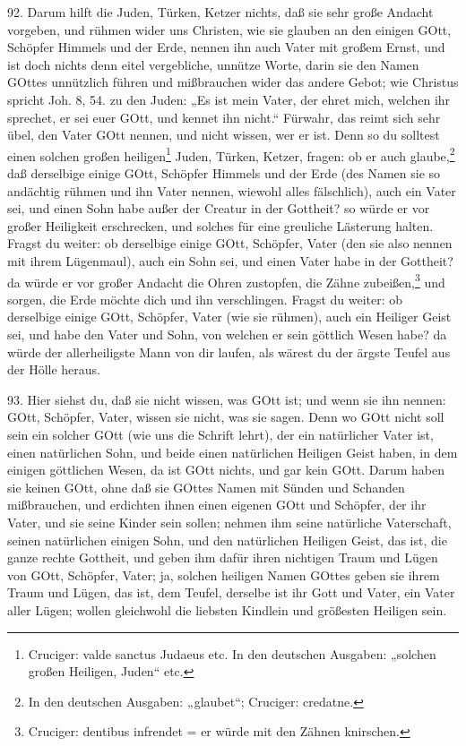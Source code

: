 92. Darum hilft die Juden, Türken, Ketzer nichts, daß sie sehr große Andacht vorgeben, und rühmen wider uns Christen, wie sie glauben an den einigen GOtt, Schöpfer Himmels und der Erde, nennen ihn auch Vater mit großem Ernst, und ist doch nichts denn eitel vergebliche, unnütze Worte, darin sie den Namen GOttes unnützlich führen und mißbrauchen wider das andere Gebot; wie Christus spricht Joh. 8, 54. zu den Juden: „Es ist mein Vater, der ehret mich, welchen ihr sprechet, er sei euer GOtt, und kennet ihn nicht.“ Fürwahr, das reimt sich sehr übel, den Vater GOtt nennen, und nicht wissen, wer er ist. Denn so du solltest einen solchen großen heiligen\footnote{Cruciger: valde sanctus Judaeus etc. In den deutschen Ausgaben: „solchen großen Heiligen, Juden“ etc.} Juden, Türken, Ketzer, fragen: ob er auch glaube,\footnote{In den deutschen Ausgaben: „glaubet“; Cruciger: credatne.} daß derselbige einige GOtt, Schöpfer Himmels und der Erde (des Namen sie so andächtig rühmen und ihn Vater nennen, wiewohl alles fälschlich), auch ein Vater sei, und einen Sohn habe außer der Creatur in der Gottheit? so würde er vor großer Heiligkeit erschrecken, und solches für eine greuliche Lästerung halten. Fragst du weiter: ob derselbige einige GOtt, Schöpfer, Vater (den sie also nennen mit ihrem Lügenmaul), auch ein Sohn sei, und einen Vater habe in der Gottheit? da würde er vor großer Andacht die Ohren zustopfen, die Zähne zubeißen,\footnote{Cruciger: dentibus infrendet = er würde mit den Zähnen knirschen.} und sorgen, die Erde möchte dich und ihn verschlingen. Fragst du weiter: ob derselbige einige GOtt, Schöpfer, Vater (wie sie rühmen), auch ein Heiliger Geist sei, und habe den Vater und Sohn, von welchen er sein göttlich Wesen habe? da würde der allerheiligste Mann von dir laufen, als wärest du der ärgste Teufel aus der Hölle heraus.

93. Hier siehst du, daß sie nicht wissen, was GOtt ist; und wenn sie ihn nennen: GOtt, Schöpfer, Vater, wissen sie nicht, was sie sagen. Denn wo GOtt nicht soll sein ein solcher GOtt (wie uns die Schrift lehrt), der ein natürlicher Vater ist, einen natürlichen Sohn, und beide einen natürlichen Heiligen Geist haben, in dem einigen göttlichen Wesen, da ist GOtt nichts, und gar kein GOtt. Darum haben sie keinen GOtt, ohne daß sie GOttes Namen mit Sünden und Schanden mißbrauchen, und erdichten ihnen einen eigenen GOtt und Schöpfer, der ihr Vater, und sie seine Kinder sein sollen; nehmen ihm seine natürliche Vaterschaft, seinen natürlichen einigen Sohn, und den natürlichen Heiligen Geist, das ist, die ganze rechte Gottheit, und geben ihm dafür ihren nichtigen Traum und Lügen von GOtt, Schöpfer, Vater; ja, solchen heiligen Namen GOttes geben sie ihrem Traum und Lügen, das ist, dem Teufel, derselbe ist ihr Gott und Vater, ein Vater aller Lügen; wollen
gleichwohl die liebsten Kindlein und größesten Heiligen sein.

